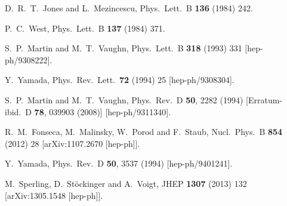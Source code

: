 \documentclass[final,3p,11pt,pdflatex]{elsarticle}
\begin{document}
\begin{thebibliography}{100}
  D.~R.~T.~Jones and L.~Mezincescu,
  Phys.\ Lett.\ B {\bf 136} (1984) 242.

  P.~C.~West,
  Phys.\ Lett.\ B {\bf 137} (1984) 371.

  S.~P.~Martin and M.~T.~Vaughn,
  Phys.\ Lett.\ B {\bf 318} (1993) 331
  [hep-ph/9308222].

  Y.~Yamada,
  Phys.\ Rev.\ Lett.\  {\bf 72} (1994) 25
  [hep-ph/9308304].

  S.~P.~Martin and M.~T.~Vaughn,
  Phys.\ Rev.\ D {\bf 50}, 2282 (1994)
  [Erratum-ibid.\ D {\bf 78}, 039903 (2008)]
  [hep-ph/9311340].

  R.~M.~Fonseca, M.~Malinsky, W.~Porod and F.~Staub,
  Nucl.\ Phys.\ B {\bf 854} (2012) 28
  [arXiv:1107.2670 [hep-ph]].

  Y.~Yamada,
  Phys.\ Rev.\ D {\bf 50}, 3537 (1994)
  [hep-ph/9401241].

  M.~Sperling, D.~Stöckinger and A.~Voigt,
  JHEP {\bf 1307} (2013) 132
  [arXiv:1305.1548 [hep-ph]].


\end{thebibliography}
\end{document}

